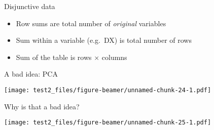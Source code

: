 \documentclass[
  ignorenonframetext,
]{beamer}
\providecommand{\tightlist}{%
  \setlength{\itemsep}{0pt}\setlength{\parskip}{0pt}}
\begin{document}
\begin{frame}{Disjunctive data}
\protect\hypertarget{disjunctive-data-1}{}

\begin{table}[H]
\centering
{}
\end{table}

\begin{itemize}[<+->]
\tightlist
\item
  Row sums are total number of \emph{original} variables
\item
  Sum within a variable (e.g.~DX) is total number of rows
\item
  Sum of the table is rows \(\times\) columns
\end{itemize}

\end{frame}

\begin{frame}{A bad idea: PCA}
\protect\hypertarget{a-bad-idea-pca}{}

\end{frame}

\begin{frame}

\texttt{[image: test2\_files/figure-beamer/unnamed-chunk-24-1.pdf]}

\end{frame}

\begin{frame}{Why is that a bad idea?}
\protect\hypertarget{why-is-that-a-bad-idea}{}

\texttt{[image: test2\_files/figure-beamer/unnamed-chunk-25-1.pdf]}

\end{frame}
\end{document}
